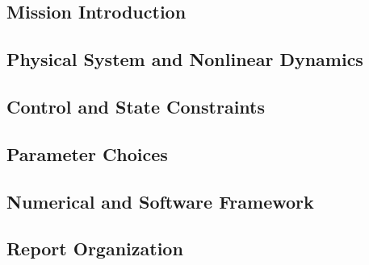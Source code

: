 
\subsection*{Mission Introduction}

\subsection*{Physical System and Nonlinear Dynamics}

\subsection*{Control and State Constraints}

\subsection*{Parameter Choices}

\subsection*{Numerical and Software Framework}

\subsection*{Report Organization}
